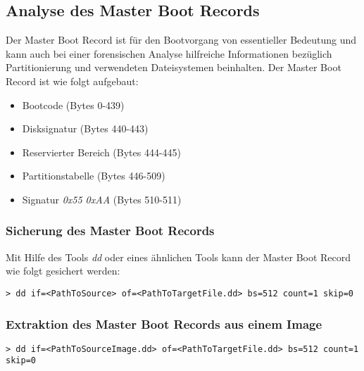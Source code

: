 \subsection{Analyse des Master Boot Records}
Der Master Boot Record ist für den Bootvorgang von essentieller Bedeutung und kann auch bei einer forensischen Analyse hilfreiche Informationen bezüglich Partitionierung und verwendeten Dateisystemen beinhalten. Der Master Boot Record ist wie folgt aufgebaut:

\begin{itemize}
\item Bootcode (Bytes 0-439)
\item Disksignatur (Bytes 440-443)
\item Reservierter Bereich (Bytes 444-445)
\item Partitionstabelle (Bytes 446-509)
\item Signatur \textit{0x55 0xAA} (Bytes 510-511)
\end{itemize}

\subsubsection{Sicherung des Master Boot Records}
Mit Hilfe des Tools \textit{dd} oder eines ähnlichen Tools kann der Master Boot Record wie folgt gesichert werden:

\begin{lstlisting}
> dd if=<PathToSource> of=<PathToTargetFile.dd> bs=512 count=1 skip=0
\end{lstlisting}


\subsubsection{Extraktion des Master Boot Records aus einem Image}
\begin{lstlisting}
> dd if=<PathToSourceImage.dd> of=<PathToTargetFile.dd> bs=512 count=1 skip=0
\end{lstlisting}


